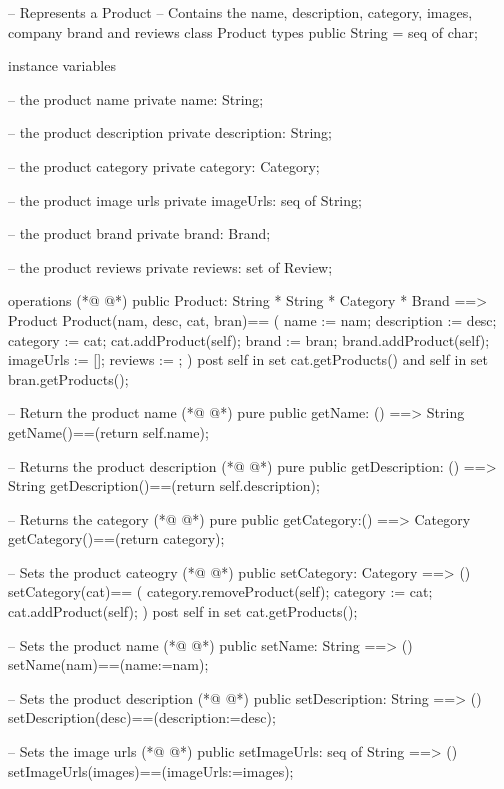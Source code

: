 \begin{vdmpp}[breaklines=true]
-- Represents a Product
-- Contains the name, description, category, images, company brand and reviews 
class Product
 types 
  public String = seq of char;
  
 instance variables
 
   -- the product name
  private name: String;
  
  -- the product description
  private description: String;
  
  -- the product category
  private category: Category;
  
  -- the product image urls
  private imageUrls: seq of String;
  
  -- the product brand
  private brand: Brand;
  
  -- the product reviews
  private reviews: set of Review;
 
 operations
(*@
\label{Product:28}
@*)
  public Product: String * String * Category * Brand ==> Product
  Product(nam, desc, cat, bran)== 
  (
    name := nam;
    description := desc;
    category := cat;
    cat.addProduct(self);
    brand := bran;
    brand.addProduct(self);
    imageUrls := [];
    reviews := {}; 
  )
  post self in set cat.getProducts() and 
     self in set bran.getProducts();
  
  -- Return the product name
(*@
\label{getName:44}
@*)
  pure public getName: () ==> String 
  getName()==(return self.name);
  
  -- Returns the product description
(*@
\label{getDescription:48}
@*)
  pure public getDescription: () ==> String
  getDescription()==(return self.description);
  
  -- Returns the category
(*@
\label{getCategory:52}
@*)
  pure public getCategory:() ==> Category
  getCategory()==(return category);
  
  -- Sets the product cateogry
(*@
\label{setCategory:56}
@*)
  public setCategory: Category ==> ()
  setCategory(cat)==
  (
   category.removeProduct(self);
   category := cat;
   cat.addProduct(self);
  )
  post self in set cat.getProducts();
  
  -- Sets the product name
(*@
\label{setName:66}
@*)
  public setName: String ==> ()
  setName(nam)==(name:=nam);
  
  -- Sets the product description
(*@
\label{setDescription:70}
@*)
  public setDescription: String ==> ()
  setDescription(desc)==(description:=desc);
  
  -- Sets the image urls
(*@
\label{setImageUrls:74}
@*)
  public setImageUrls: seq of String ==> ()
  setImageUrls(images)==(imageUrls:=images);
  

\end{vdmpp}
